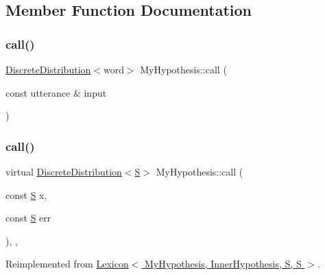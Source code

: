 \subsection{Member Function Documentation}
\mbox{\label{class_my_hypothesis_a88c6c3c093e040601d7283abf09b6348}} 
\subsubsection{\texorpdfstring{call()}{call()}\hspace{0.1cm}{\footnotesize\ttfamily [1/2]}}
{\footnotesize\ttfamily \hyperlink{class_discrete_distribution}{Discrete\+Distribution}$<$word$>$ My\+Hypothesis\+::call (\begin{DoxyParamCaption}\item[{const utterance \&}]{input }\end{DoxyParamCaption})\hspace{0.3cm}{\ttfamily [inline]}}

\mbox{\label{class_my_hypothesis_a61391d3f1f6fbbe37663b22e2068ac90}} 
\subsubsection{\texorpdfstring{call()}{call()}\hspace{0.1cm}{\footnotesize\ttfamily [2/2]}}
{\footnotesize\ttfamily virtual \hyperlink{class_discrete_distribution}{Discrete\+Distribution}$<$\hyperlink{_models_2_formal_language_theory-_complex_2_main_8cpp_a51c40915539205f0b5add30b0d68a4cb}{S}$>$ My\+Hypothesis\+::call (\begin{DoxyParamCaption}\item[{const \hyperlink{_models_2_formal_language_theory-_complex_2_main_8cpp_a51c40915539205f0b5add30b0d68a4cb}{S}}]{x,  }\item[{const \hyperlink{_models_2_formal_language_theory-_complex_2_main_8cpp_a51c40915539205f0b5add30b0d68a4cb}{S}}]{err }\end{DoxyParamCaption})\hspace{0.3cm}{\ttfamily [inline]}, {\ttfamily [override]}, {\ttfamily [virtual]}}



Reimplemented from \hyperlink{class_lexicon_afc6b762f68c6033a501ce7ca04b01ece}{Lexicon$<$ My\+Hypothesis, Inner\+Hypothesis, S, S $>$}.

